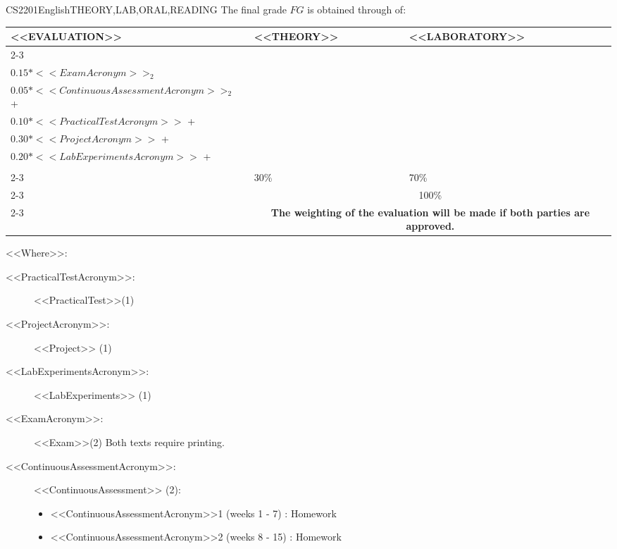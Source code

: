   \begin{evaluation}{CS2201}{English}{THEORY,LAB,ORAL,READING}
  The final grade $FG$ is obtained through of:
 
  \begin{tabularx}{0.9\textwidth}{|X|p{}|p{}|} \hline
  \multirow{4}{*}{\uppercase{<<Evaluation>>}} & \uppercase{<<Theory>>} & \uppercase{<<Laboratory>>} \\ \cline{2-3}
  & %
      \begin{minipage}{0.95\textwidth}
      \begin{tabular}{l}
          $0.15*<<ExamAcronym>>_{1}$ + \\
          $0.15*<<ExamAcronym>>_{2}$
          \end{tabular} 
      \end{minipage} 
  & %
      \begin{minipage}{0.95\textwidth}
      \begin{tabular}{l}
          $0.05*<<ContinuousAssessmentAcronym>>_{1}$ + \\
          $0.05*<<ContinuousAssessmentAcronym>>_{2}$ + \\
          $0.10*<<PracticalTestAcronym>>$ + \\
          $0.30*<<ProjectAcronym>>$ + \\
          $0.20*<<LabExperimentsAcronym>>$ + \\
      \end{tabular} 
      \end{minipage}                 \\ \cline{2-3}
  & %
  30\% 
  & %
  70\% \\ \cline{2-3}
  & \multicolumn{2}{c|}{100\%}  \\ \cline{2-3}
  & \multicolumn{2}{c|}{\textbf{\textbf{The weighting of the evaluation will be made if both parties are approved.}}}  \\ \hline
  \end{tabularx}
    
  \vspace{2mm}
  \noindent <<Where>>:
  \begin{description}
    \item[<<PracticalTestAcronym>>:] <<PracticalTest>>(1)
    \item[<<ProjectAcronym>>:]  <<Project>> (1)
    \item[<<LabExperimentsAcronym>>:] <<LabExperiments>> (1)
    \item[<<ExamAcronym>>:] <<Exam>>(2) Both texts require printing.
    \item[<<ContinuousAssessmentAcronym>>:] <<ContinuousAssessment>> (2):
      \begin{itemize}
          \item  <<ContinuousAssessmentAcronym>>1 (weeks 1 - 7) : Homework
          \item <<ContinuousAssessmentAcronym>>2 (weeks 8 - 15) : Homework 
      \end{itemize}
  \end{description}


\end{evaluation}
